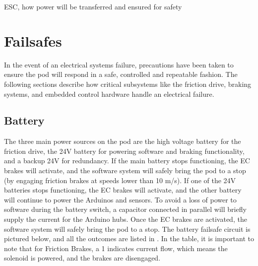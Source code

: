 \documentclass[main.tex]{subfiles}
\begin{document}
    ESC, how power will be transferred and ensured for safety

    \section{Failsafes}
    In the event of an electrical systems failure, precautions have been taken to ensure the pod will respond in a safe, controlled and repeatable fashion. The following sections describe how critical subsystems like the friction drive, braking systems, and embedded control hardware handle an electrical failure.
    \subsection{Battery}
    The three main power sources on the pod are the high voltage battery for the friction drive, the 24V battery for powering software and braking functionality, and a backup 24V for redundancy.  If the main battery stops functioning, the EC brakes will activate, and the software system will safely bring the pod to a stop (by engaging friction brakes at speeds lower than 10 m/s). If one of the 24V batteries stops functioning, the EC brakes will activate, and the other battery will continue to power the Arduinos and sensors. To avoid a loss of power to software during the battery switch, a capacitor connected in parallel will briefly supply the current for the Arduino hubs. Once the EC brakes are activated, the software system will safely bring the pod to a stop. The battery failsafe circuit is pictured below, and all the outcomes are listed in . In the table, it is important to note that for Friction Brakes, a 1 indicates current flow, which means the solenoid is powered, and the brakes are disengaged.
    
\end{document}
